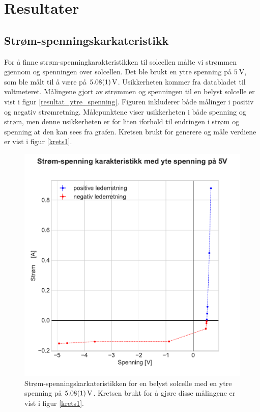 \documentclass[%
 reprint,
 amsmath,amssymb,
 aps,
 norsk,
 booktabs
]{revtex4-1}
\begin{document}
\section{Resultater}
\subsection{Strøm-spenningskarkateristikk}
For å finne strøm-spenningkarakteristikken til solcellen målte vi strømmen gjennom og spenningen over solcellen. Det ble brukt en ytre spenning på $\SI{5}{\volt}$, som ble målt til å være på $\SI{5.08\pm0.01}{\volt}$. Usikkerheten kommer fra databladet til voltmeteret. Målingene gjort av strømmen og spenningen til en belyst solcelle er vist i figur \vref{resultat_ytre_spenning}. Figuren inkluderer både målinger i positiv og negativ strømretning. Målepunktene viser usikkerheten i både spenning og strøm, men denne usikkerheten er for liten iforhold til endringen i strøm og spenning at den kan sees fra grafen. Kretsen brukt for generere og måle verdiene er vist i figur \vref{krets1}. \\
\begin{figure}
  \centering
  \includegraphics[scale=0.47]{ytre_spenning.pdf}
  \caption{Strøm-spenningskarkateristikken for en belyst solcelle med en ytre spenning på $\SI{5.08\pm0.01}{\volt}$. Kretsen brukt for å gjøre disse målingene er vist i figur \vref{krets1}.}
  \label{resultat_ytre_spenning}
\end{figure}
\end{document}
